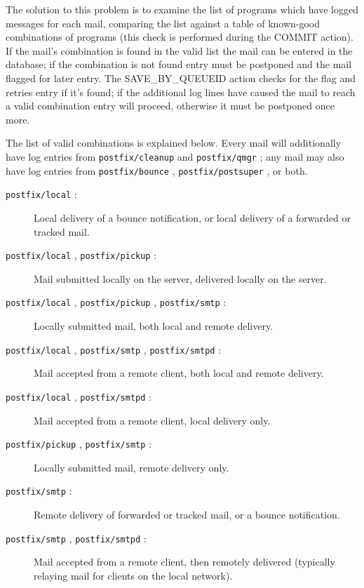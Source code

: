 \documentclass[a4paper,12pt,draft]{article}
\newcommand{\daemon}[1]{%
    \texttt{postfix/#1}%
}
\begin{document}
The solution to this problem is to examine the list of programs which have
logged messages for each mail, comparing the list against a table of
known-good combinations of programs (this check is performed during the
COMMIT action).  If the mail's combination is found in the valid list the
mail can be entered in the database; if the combination is not found entry
must be postponed and the mail flagged for later entry.  The
SAVE\_BY\_QUEUEID action checks for the flag and retries entry if it's
found; if the additional log lines have caused the mail to reach a valid
combination entry will proceed, otherwise it must be postponed once more.

The list of valid combinations is explained below.  Every mail will
additionally have log entries from \daemon{cleanup} and \daemon{qmgr}; any
mail may also have log entries from \daemon{bounce}, \daemon{postsuper}, or
both.

\begin{description}

    \item [\daemon{local}:] Local delivery of a bounce notification, or
        local delivery of a forwarded or tracked mail.

    \item [\daemon{local}, \daemon{pickup}:] Mail submitted locally on the
        server, delivered locally on the server.

    \item [\daemon{local}, \daemon{pickup}, \daemon{smtp}:] Locally
        submitted mail, \newline both local and remote delivery.

    \item [\daemon{local}, \daemon{smtp}, \daemon{smtpd}:] Mail accepted
        from a remote client, both local and remote delivery.

    \item [\daemon{local}, \daemon{smtpd}:] Mail accepted from a remote
        client, local delivery only.

    \item [\daemon{pickup}, \daemon{smtp}:] Locally submitted mail, remote
        delivery only.

    \item [\daemon{smtp}:] Remote delivery of forwarded or tracked mail, or
        a bounce notification.

    \item [\daemon{smtp}, \daemon{smtpd}:] Mail accepted from a remote
        client, then remotely delivered (typically relaying mail for
        clients on the local network).

\end{description}
\end{document}
